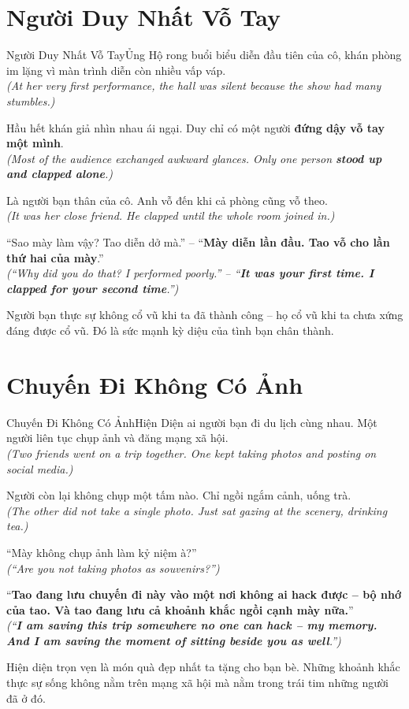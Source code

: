 \section{Người Duy Nhất Vỗ Tay}
\begin{truyen}{Người Duy Nhất Vỗ Tay}{Ủng Hộ}
rong buổi biểu diễn đầu tiên của cô, khán phòng im lặng vì màn trình diễn còn nhiều vấp váp.\\
\textit{(At her very first performance, the hall was silent because the show had many stumbles.)}

Hầu hết khán giả nhìn nhau ái ngại. Duy chỉ có một người \textbf{đứng dậy vỗ tay một mình}.\\
\textit{(Most of the audience exchanged awkward glances. Only one person \textbf{stood up and clapped alone}.)}

Là người bạn thân của cô. Anh vỗ đến khi cả phòng cũng vỗ theo.\\
\textit{(It was her close friend. He clapped until the whole room joined in.)}

``Sao mày làm vậy? Tao diễn dở mà.'' – ``\textbf{Mày diễn lần đầu. Tao vỗ cho lần thứ hai của mày}.''\\
\textit{(``Why did you do that? I performed poorly.'' – ``\textbf{It was your first time. I clapped for your second time}.'')}
\end{truyen}
\begin{baihoc}
  Người bạn thực sự không cổ vũ khi ta đã thành công – họ cổ vũ khi ta chưa xứng đáng được cổ vũ. Đó là sức mạnh kỳ diệu của tình bạn chân thành.
\end{baihoc}

\section{Chuyến Đi Không Có Ảnh}
\begin{truyen}{Chuyến Đi Không Có Ảnh}{Hiện Diện}
ai người bạn đi du lịch cùng nhau. Một người liên tục chụp ảnh và đăng mạng xã hội.\\
\textit{(Two friends went on a trip together. One kept taking photos and posting on social media.)}

Người còn lại không chụp một tấm nào. Chỉ ngồi ngắm cảnh, uống trà.\\
\textit{(The other did not take a single photo. Just sat gazing at the scenery, drinking tea.)}

``Mày không chụp ảnh làm kỷ niệm à?''\\
\textit{(``Are you not taking photos as souvenirs?'')}

``\textbf{Tao đang lưu chuyến đi này vào một nơi không ai hack được – bộ nhớ của tao. Và tao đang lưu cả khoảnh khắc ngồi cạnh mày nữa.}''\\
\textit{(``\textbf{I am saving this trip somewhere no one can hack – my memory. And I am saving the moment of sitting beside you as well}.'')}
\end{truyen}
\begin{baihoc}
  Hiện diện trọn vẹn là món quà đẹp nhất ta tặng cho bạn bè. Những khoảnh khắc thực sự sống không nằm trên mạng xã hội mà nằm trong trái tim những người đã ở đó.
\end{baihoc}

